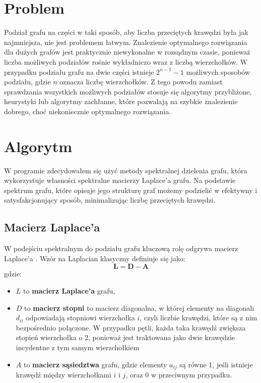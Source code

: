 \documentclass{article}
\begin{document}
\section{Problem}

    Podział grafu na części w taki sposób, aby liczba przeciętych krawędzi była jak najmniejsza, nie jest problemem łatwym. Znalezienie optymalnego rozwiązania dla dużych grafów jest praktycznie niewykonalne w rozsądnym czasie, ponieważ liczba możliwych podziałów rośnie wykładniczo wraz z liczbą wierzchołków.
    W przypadku podziału grafu na dwie części istnieje \( 2^{n-1} - 1 \) możliwych sposobów podziału, gdzie \( n \) oznacza liczbę wierzchołków. Z tego powodu zamiast sprawdzania wszystkich możliwych podziałów stosuje się algorytmy przybliżone, heurystyki lub algorytmy zachłanne, które pozwalają na szybkie znalezienie dobrego, choć niekoniecznie optymalnego rozwiązania.

\section{Algorytm}

W programie zdecydowałem się użyć metody spektralnej dzielenia grafu, która wykorzystuje własności spektralne macierzy Laplace'a grafu. Na podstawie spektrum grafu, które opisuje jego strukturę graf możemy podzielić w efektywny i satysfakcjonujący sposób, minimalizując liczbę przeciętych krawędzi.


    \subsection{Macierz Laplace'a}
    
    W podejściu spektralnym do podziału grafu kluczową rolę odgrywa macierz Laplace'a \cite{laplacian_matrix}.
    Wzór na Laplacian klasyczny definiuje się jako:
    \[
    \mathbf{L} = \mathbf{D} - \mathbf{A}
    \]
    gdzie:
    \begin{itemize}
      \item \( L \) to \textbf{macierz Laplace'a} grafu,
      \item \( D \) to \textbf{macierz stopni} to macierz diagonalna, w której elementy na diagonali \( d_{ii} \) odpowiadają stopniowi wierzchołka \( i \), czyli liczbie krawędzi, które są z nim bezpośrednio połączone. W przypadku pętli, każda taka krawędź zwiększa stopień wierzchołka o 2, ponieważ jest traktowana jako dwie krawędzie incydentne z tym samym wierzchołkiem
      \item \( A \) to \textbf{macierz sąsiedztwa} grafu, gdzie elementy \( a_{ij} \) są równe 1, jeśli istnieje krawędź między wierzchołkami \( i \) i \( j \), oraz 0 w przeciwnym przypadku.
    \end{itemize}
    
\end{document}
